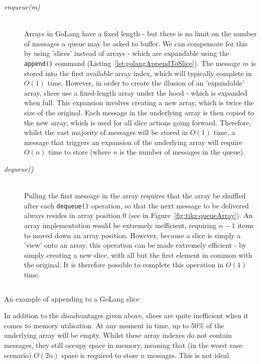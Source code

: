 \begin{description}
  \item[\textit{enqueue(m)}] \hfill \\
    Arrays in GoLang have a fixed length - but there is no limit on the number
    of messages a queue may be asked to buffer. We can compensate for this by
    using 'slices' instead of arrays -
    which are expandable using the \texttt{append()} command
    (Listing~\ref{lst:golangAppendToSlice}). The message $m$ is stored into the
    first available array index, which will typically complete in $O(1)$ time.
    However, in order to create the illusion of an 'expandable' array, slices
    use a fixed-length array under the hood - which is expanded when full. This
    expansion involves creating a new array, which is twice the size of the
    original. Each message in the underlying array is then copied to the new
    array, which is used for all slice actions going forward. Therefore, whilst
    the vast majority of messages will be stored in $O(1)$ time, a message that
    triggers an expansion of the underlying array will require $O(n)$ time to
    store (where $n$ is the number of messages in the queue).
  \item[\textit{dequeue()}] \hfill \\
    Pulling the first message in the array requires that the array be shuffled
    after each \texttt{dequeue()} operation, so that the next message to
    be delivered always resides in  array position 0 (see in
    Figure~\ref{fig:tikz:queueArray}). An array implementation would be
    extremely inefficient, requiring $n - 1$ items to moved down an array
    position. However, because a slice is simply a 'view' onto an array, this
    operation can be made extremely efficient - by simply creating a new slice,
    with all but the first element in common with the original.
    It is therefore possible to complete this operation in $O(1)$ time.
\end{description}

\begin{listing}[ht]
  \centering
  \inputminted[firstline=7, lastline=12]{go}{code/snippets/appendToSlice.go}
  \caption{An example of appending to a GoLang slice}
  \label{lst:golangAppendToSlice}
\end{listing}

In addition to the disadvantages given above, slices are quite inefficient when
it comes to memory utilisation. At any moment in time, up to 50\% of the
underlying array will be empty. Whilst these array indexes do not contain
messages, they still occupy space in memory, meaning that (in the worst case
scenario) $O(2n)$ space is required to store $n$ messages. This is not ideal.

